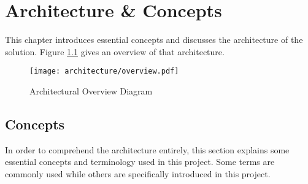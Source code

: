 \chapter{Architecture \& Concepts}

This chapter introduces essential concepts and discusses the architecture of the solution. Figure \ref{fig:architecture-overview} gives an overview of that architecture.

\begin{figure}[ht]
    \texttt{[image: architecture/overview.pdf]}
    \caption{Architectural Overview Diagram}
    \label{fig:architecture-overview}
\end{figure}

\section{Concepts}

In order to comprehend the architecture entirely, this section explains some essential concepts and terminology used in this project. Some terms are commonly used while others are specifically introduced in this project.

